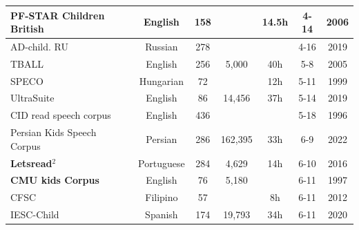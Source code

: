 \begin{table}
\begin{tabular}{l|c|c|c|c|c|c}
\hline
PF-STAR Children British \cite{pfstar,russell2006pf,pf-star-british} & English & 158 &  & 14.5h & 4-14 & 2006 \\ 
\hline
AD-child. RU \cite{ad-child_ru} & Russian & 278 &  &  & 4-16 & 2019 \\ 
\hline
TBALL \cite{tball} & English & 256 & 5,000 & 40h & 5-8 & 2005 \\ 
\hline
SPECO \cite{speco} & Hungarian & 72 &  & 12h & 5-11 & 1999 \\ 
\hline
UltraSuite\cite{eshky2019ultrasuite} & English & 86 & 14,456 & 37h & 5-14 & 2019 \\ 
\hline
CID read speech corpus \cite{lee1999acoustics} & English & 436 &  &  & 5-18 & 1996 \\ 
\hline
Persian Kids Speech Corpus \cite{khanzadi2022persian} & Persian & 286 & 162,395 & 33h & 6-9 & 2022 \\ 
\hline
\textbf{Letsread$^2$} \cite{letsread} & Portuguese & 284 & 4,629 & 14h & 6-10 & 2016 \\ 
\hline
\textbf{CMU kids Corpus} \cite{cmu} & English & 76 & 5,180 &  & 6-11 & 1997 \\ 
\hline
CFSC \cite{CFSC} & Filipino & 57 &  & 8h & 6-11 & 2012 \\ 
\hline
IESC-Child \cite{PEREZESPINOSA202055} & Spanish & 174 & 19,793 & 34h & 6-11 & 2020 \\ 
\hline


\end{tabular}
\end{table}
